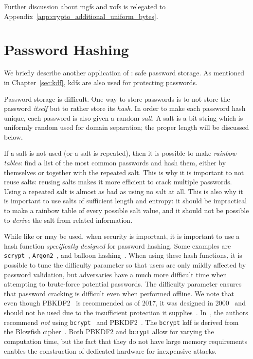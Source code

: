 Further discussion about \glspl{mgf} and \glspl{xof} is relegated to
Appendix~\ref{app:crypto_additional_uniform_bytes}.



\section{Password Hashing}
\label{sec:hash_apps_password_hashing}

We briefly describe another application of :
safe password storage.
As mentioned in Chapter~\ref{sec:kdf}, \glspl{kdf}
are also used for protecting passwords.

Password storage is difficult.
One way to store passwords is to not store the password \emph{itself}
but to rather store its \emph{hash}.
In order to make each password hash unique, each password
is also given a random \emph{\gls{salt}}.
A \gls{salt} is a bit string which is uniformly random used
for domain separation;
the proper length will be discussed below.

If a \gls{salt} is not used (or a \gls{salt} is repeated),
then it is possible to make \emph{rainbow tables}:
find a list of the most common passwords and hash them,
either by themselves or together with the repeated \gls{salt}.
This is why it is important to not reuse \glspl{salt}:
reusing \glspl{salt} makes it more efficient to crack multiple passwords.
Using a repeated \gls{salt} is almost as bad as
using no \gls{salt} at all.
This is also why it is important to use \glspl{salt}
of sufficient length and entropy:
it should be impractical to make a rainbow table
of every possible \gls{salt} value,
and it should not be possible to \emph{derive} the \gls{salt}
from related information.

While  like \ShaTwo{} or \ShaThree{} may be used,
when security is important, it is important to use a \gls{hash function}
\emph{specifically designed} for password hashing.
Some examples are \texttt{scrypt}~\cite{scryptPaper,rfc7914},
\texttt{Argon2}~\cite{argon2},
and balloon hashing~\cite{cryptoeprint:2016:027}.
When using these \glspl{hash function}, it is possible to tune
the difficulty parameter so that users are only mildly affected
by password validation,
but adversaries have a much more difficult time
when attempting to brute-force potential passwords.
The difficulty parameter ensures that password cracking is difficult
even when performed offline.
We note that even though PBKDF2~\cite{rfc8018} is recommended
as of 2017, it was designed in 2000~\cite{rfc2898}
and should not be used due to the insufficient protection
it supplies~\cite{blocki2018economics}.
In~\cite{blocki2018economics}, the authors recommend \emph{not}
using \texttt{bcrypt}~\cite{bcryptPaper}
and PBKDF2~\cite{rfc2898}.
The \texttt{bcrypt} \gls{kdf}
is derived from the Blowfish cipher~\cite{BlowfishAlg}.
Both PBKDF2 and \texttt{bcrypt} allow for varying the computation time,
but the fact that they do not have large memory requirements
enables the construction of dedicated hardware
for inexpensive attacks.

